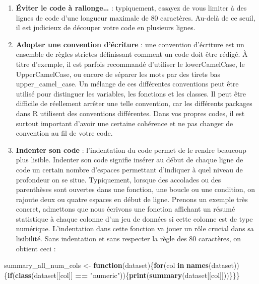 \documentclass[
  11pt,
  french,
]{book}
\makeatletter
\newenvironment{Shaded}{\begin{snugshade}}{\end{snugshade}}
\newcommand{\ControlFlowTok}[1]{\textcolor[rgb]{0.13,0.29,0.53}{\textbf{#1}}}
\newcommand{\KeywordTok}[1]{\textcolor[rgb]{0.13,0.29,0.53}{\textbf{#1}}}
\newcommand{\NormalTok}[1]{#1}
\newcommand{\OperatorTok}[1]{\textcolor[rgb]{0.81,0.36,0.00}{\textbf{#1}}}
\newcommand{\StringTok}[1]{\textcolor[rgb]{0.31,0.60,0.02}{#1}}
\newenvironment{kframe}{%
\medskip{}
\setlength{\fboxsep}{.8em}
 \def\at@end@of@kframe{}%
 \ifinner\ifhmode%
  \def\at@end@of@kframe{\end{minipage}}%
  \begin{minipage}{\columnwidth}%
 \fi\fi%
 \def\FrameCommand##1{\hskip\@totalleftmargin \hskip-\fboxsep
 \colorbox{shadecolor}{##1}\hskip-\fboxsep
     \hskip-\linewidth \hskip-\@totalleftmargin \hskip\columnwidth}%
 \MakeFramed {\advance\hsize-\width
   \@totalleftmargin\z@ \linewidth\hsize
   \@setminipage}}%
 {\par\unskip\endMakeFramed%
 \at@end@of@kframe}
\renewenvironment{Shaded}{\begin{kframe}}{\end{kframe}}
\makeatother
\begin{document}
\begin{enumerate}
\def\labelenumi{\arabic{enumi}.}
\setcounter{enumi}{2}
\item
  \textbf{Éviter le code à rallonge\ldots{}} : typiquement, essayez de vous limiter à des lignes de code d'une longueur maximale de 80 caractères. Au-delà de ce seuil, il est judicieux de découper votre code en plusieurs lignes.
\item
  \textbf{Adopter une convention d'écriture} : une convention d'écriture est un ensemble de règles strictes définissant comment un code doit être rédigé. À titre d'exemple, il est parfois recommandé d'utiliser le lowerCamelCase, le UpperCamelCase, ou encore de séparer les mots par des tirets bas upper\_camel\_case. Un mélange de ces différentes conventions peut être utilisé pour distinguer les variables, les fonctions et les classes. Il peut être difficile de réellement arrêter une telle convention, car les différents packages dans R utilisent des conventions différentes. Dans vos propres codes, il est surtout important d'avoir une certaine cohérence et ne pas changer de convention au fil de votre code.
\item
  \textbf{Indenter son code} : l'indentation du code permet de le rendre beaucoup plus lisible. Indenter son code signifie insérer au début de chaque ligne de code un certain nombre d'espaces permettant d'indiquer à quel niveau de profondeur on se situe. Typiquement, lorsque des accolades ou des parenthèses sont ouvertes dans une fonction, une boucle ou une condition, on rajoute deux ou quatre espaces en début de ligne. Prenons un exemple très concret, admettons que nous écrivons une fonction affichant un résumé statistique à chaque colonne d'un jeu de données si cette colonne est de type numérique. L'indentation dans cette fonction va jouer un rôle crucial dans sa lisibilité.
  Sans indentation et sans respecter la règle des 80 caractères, on obtient ceci :
\end{enumerate}

\begin{Shaded}
\begin{Highlighting}[]
\NormalTok{summary_all_num_cols <-}\StringTok{ }\ControlFlowTok{function}\NormalTok{(dataset)\{}\ControlFlowTok{for}\NormalTok{(col }\ControlFlowTok{in} \KeywordTok{names}\NormalTok{(dataset))\{}\ControlFlowTok{if}\NormalTok{(}\KeywordTok{class}\NormalTok{(dataset[[col]] }\OperatorTok{==}\StringTok{ "numeric"}\NormalTok{))\{}\KeywordTok{print}\NormalTok{(}\KeywordTok{summary}\NormalTok{(dataset[[col]]))\}\}\}}
\end{Highlighting}
\end{Shaded}
\end{document}
